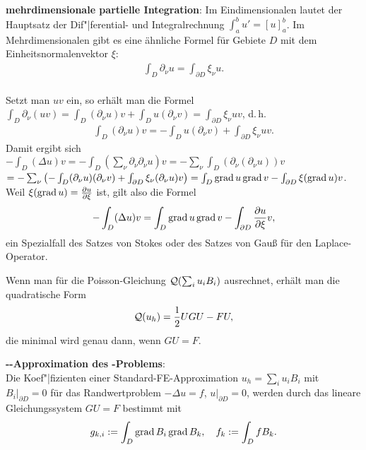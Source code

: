 \textbf{mehrdimensionale partielle Integration}:
Im Eindimensionalen lautet der Hauptsatz der Dif"|ferential- und Integralrechnung
$\int_a^b u' = [u]_a^b$.
Im Mehrdimensionalen gibt es eine ähnliche Formel für Gebiete $D$
mit dem Einheitsnormalenvektor $\xi$:
\begin{align*}
    \int_D \partial_\nu u = \int_{\partial D} \xi_\nu u.
\end{align*}\\
Setzt man $uv$ ein, so erhält man die Formel
$\int_D \partial_\nu (uv) = \int_D (\partial_\nu u) v + \int_D u (\partial_\nu v) =
\int_{\partial D} \xi_\nu uv$, d.\,h.
\begin{align*}
    \int_D (\partial_\nu u) v
    = -\int_D u (\partial_\nu v) + \int_{\partial D} \xi_\nu uv.
\end{align*}
Damit ergibt sich $-\int_D (\Delta u) v =
-\int_D \left(\sum_\nu \partial_\nu \partial_\nu u\right) v =
-\sum_\nu \int_D (\partial_\nu (\partial_\nu u)) v$\\
$= -\sum_\nu \left(-\int_D (\partial_\nu u) (\partial_\nu v) +
\int_{\partial D} \xi_\nu (\partial_\nu u) v\right) =
\int_D \operatorname{grad} u \operatorname{grad} v - \int_{\partial D} \xi (\operatorname{grad} u) v$.\\
Weil $\xi (\operatorname{grad} u) = \frac{\partial u}{\partial \xi}$ ist, gilt also die Formel
\begin{align*}
    -\int_D (\Delta u) v = \int_D \operatorname{grad} u \operatorname{grad} v -
    \int_{\partial D} \frac{\partial u}{\partial \xi} v,
\end{align*}
ein Spezialfall des Satzes von Stokes oder des Satzes von Gauß für den Laplace-Operator.

\linie

Wenn man für die Poisson-Gleichung $\mathcal{Q}(\sum_i u_i B_i)$ ausrechnet, erhält man die quadratische
Form
\begin{align*}
    \mathcal{Q}(u_h) = \frac{1}{2} UGU - FU,
\end{align*}
die minimal wird genau dann, wenn $GU = F$.

\linie
\pagebreak

\textbf{--Approximation des -Problems}:\\
Die Koef"|fizienten einer Standard-FE-Approximation $u_h = \sum_i u_i B_i$ mit
$B_i|_{\partial D} = 0$ für das Randwertproblem $-\Delta u = f$, $u|_{\partial D} = 0$,
werden durch das lineare Gleichungssystem $GU = F$ bestimmt mit
\begin{align*}
    g_{k,i} := \int_D \operatorname{grad} B_i \operatorname{grad} B_k,\quad
    f_k := \int_D f B_k.
\end{align*}


